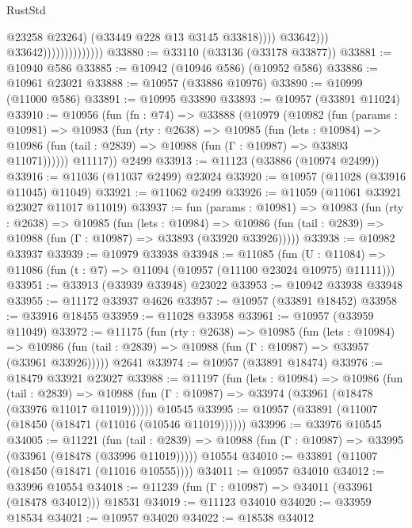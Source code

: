 \begin{lexlean}{RustStd}
\begin{coremodule}
                                              @23258
                                              @23264)
                                            (@33449 @228 @13 @3145 @33818))))
                                      @33642)))
                                @33642))))))))))))))
@33880 := @33110 (@33136 (@33178 @33877))
@33881 := @10940 @586
@33885 := @10942 (@10946 @586) (@10952 @586)
@33886 := @10961 @23021
@33888 := @10957 (@33886 @10976)
@33890 := @10999 (@11000 @586)
@33891 := @10995 @33890
@33893 := @10957 (@33891 @11024)
@33910 := @10956
    (fun (fn : @74) =>
    @33888
      (@10979
        (@10982
          (fun (params : @10981) =>
          @10983
            (fun (rty : @2638) =>
            @10985
              (fun (lets : @10984) =>
              @10986 (fun (tail : @2839) => @10988 (fun (Γ : @10987) => @33893 @11071))))))
        @11117))
    @2499
@33913 := @11123 (@33886 (@10974 @2499))
@33916 := @11036 (@11037 @2499) @23024
@33920 := @10957 (@11028 (@33916 @11045) @11049)
@33921 := @11062 @2499
@33926 := @11059 (@11061 @33921 @23027 @11017 @11019)
@33937 := fun (params : @10981) =>
  @10983
    (fun (rty : @2638) =>
    @10985
      (fun (lets : @10984) =>
      @10986 (fun (tail : @2839) => @10988 (fun (Γ : @10987) => @33893 (@33920 @33926)))))
@33938 := @10982 @33937
@33939 := @10979 @33938
@33948 := @11085
    (fun (U : @11084) => @11086 (fun (t : @7) => @11094 (@10957 (@11100 @23024 @10975) @11111)))
@33951 := @33913 (@33939 @33948) @23022
@33953 := @10942 @33938 @33948
@33955 := @11172 @33937 @4626
@33957 := @10957 (@33891 @18452)
@33958 := @33916 @18455
@33959 := @11028 @33958
@33961 := @10957 (@33959 @11049)
@33972 := @11175
    (fun (rty : @2638) =>
    @10985
      (fun (lets : @10984) =>
      @10986 (fun (tail : @2839) => @10988 (fun (Γ : @10987) => @33957 (@33961 @33926)))))
    @2641
@33974 := @10957 (@33891 @18474)
@33976 := @18479 @33921 @23027
@33988 := @11197
    (fun (lets : @10984) =>
    @10986
      (fun (tail : @2839) =>
      @10988 (fun (Γ : @10987) => @33974 (@33961 (@18478 (@33976 @11017 @11019))))))
    @10545
@33995 := @10957 (@33891 (@11007 (@18450 (@18471 (@11016 (@10546 @11019))))))
@33996 := @33976 @10545
@34005 := @11221
    (fun (tail : @2839) => @10988 (fun (Γ : @10987) => @33995 (@33961 (@18478 (@33996 @11019)))))
    @10554
@34010 := @33891 (@11007 (@18450 (@18471 (@11016 @10555))))
@34011 := @10957 @34010
@34012 := @33996 @10554
@34018 := @11239 (fun (Γ : @10987) => @34011 (@33961 (@18478 @34012))) @18531
@34019 := @11123 @34010
@34020 := @33959 @18534
@34021 := @10957 @34020
@34022 := @18538 @34012

\end{coremodule}
\end{lexlean}
